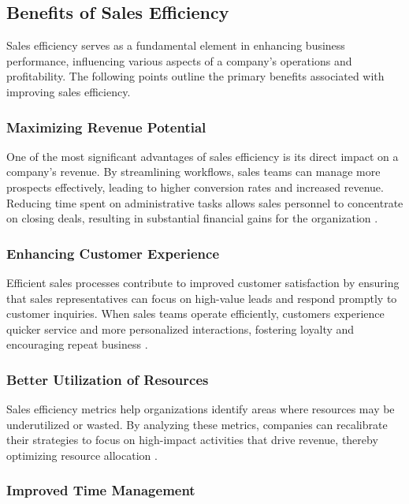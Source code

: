 \subsection{Benefits of Sales Efficiency}

Sales efficiency serves as a fundamental element in enhancing business performance, influencing various aspects of a company’s operations and profitability. The following points outline the primary benefits associated with improving sales efficiency.

\subsubsection{Maximizing Revenue Potential}

One of the most significant advantages of sales efficiency is its direct impact on a company’s revenue. By streamlining workflows, sales teams can manage more prospects effectively, leading to higher conversion rates and increased revenue. Reducing time spent on administrative tasks allows sales personnel to concentrate on closing deals, resulting in substantial financial gains for the organization \cite{maximizing_revenue}.

\subsubsection{Enhancing Customer Experience}

Efficient sales processes contribute to improved customer satisfaction by ensuring that sales representatives can focus on high-value leads and respond promptly to customer inquiries. When sales teams operate efficiently, customers experience quicker service and more personalized interactions, fostering loyalty and encouraging repeat business \cite{enhancing_customer_experience}.

\subsubsection{Better Utilization of Resources}

Sales efficiency metrics help organizations identify areas where resources may be underutilized or wasted. By analyzing these metrics, companies can recalibrate their strategies to focus on high-impact activities that drive revenue, thereby optimizing resource allocation \cite{better_utilization_resources}.

\subsubsection{Improved Time Management}


